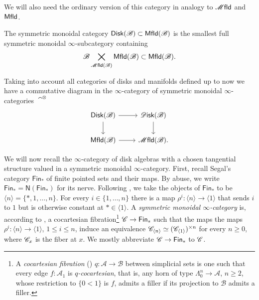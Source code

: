 \documentclass[../text]{subfiles}
\begin{document}
We will also need the ordinary version of this category in analogy to $\mfld$ and $\mfld[r]$.

\begin{definition}
    The symmetric monoidal category $\disk[r](\bstr) \subset \mfld[r](\bstr)$ is the smallest full symmetric monoidal $\infty$-subcategory containing 
    \begin{equation}
        \bstr \bigtimes\limits_{\mfld(\bstr)} \mfld[r](\bstr) \subset \mfld[r](\bstr).
    \end{equation}
\end{definition}

\begin{remark}
    Taking into account all categories of disks and manifolds defined up to now we have a commutative diagram in the $\infty$-category of symmetric monoidal $\infty$-categories $\cat^{\otimes}$
    \begin{equation}
        \begin{tikzcd}
            \disk[r](\bstr) \arrow[r] \arrow[d] & \disk (\bstr) \arrow[d] \\
            \mfld[r] (\bstr) \arrow[r] & \mfld (\bstr).
        \end{tikzcd}
    \end{equation}
\end{remark}

We will now recall the $\infty$-category of disk algebras with a chosen tangential structure valued in a symmetric monoidal $\infty$-category. First, recall Segal's category $\mathsf{Fin}_{\ast}$ of finite pointed sets and their maps. By abuse, we write $\mathsf{Fin}_\ast=\mathsf{N}(\mathsf{Fin}_\ast)$ for its nerve. Following \cite{lurie_ha}, we take the objects of $\mathsf{Fin}_{\ast}$ to be $\langle n\rangle=\{\ast,1,\dots,n\}$. For every $i\in\{1,\dots,n\}$ there is a map $\rho^i\colon\langle n\rangle\to\langle 1\rangle$ that sends $i$ to $1$ but is otherwise constant at $\ast\in\langle1\rangle$. A \emph{symmetric monoidal $\infty$-category} is, according to \cite[Definition 2.0.0.7]{lurie_ha}, a cocartesian fibration\footnote{A \emph{cocartesian fibration} (\cite[Definition 01T5]{lurie_kerodon}) $q\colon\mathscr{A}\to\mathscr{B}$ between simplicial sets is one such that every edge $f\colon\mathscr{A}_1$ is \emph{$q$-cocartesian}, that is, any horn of type $\Lambda^n_0\to\mathscr{A}$, $n\geq2$, whose restriction to $\{0<1\}$ is $f$, admits a filler if its projection to $\mathscr{B}$ admits a filler.} $\mathscr{C}\to\mathsf{Fin}_\ast$ such that the maps the maps $\rho^i\colon\langle n\rangle\to\langle 1\rangle$, $1\leq i\leq n$, induce an equivalence $\mathscr{C}_{\langle n\rangle}\simeq(\mathscr{C}_{\langle 1\rangle})^{\times n}$ for every $n\geq0$, where $\mathscr{C}_{x}$ is the fiber at $x$. We mostly abbreviate $\mathscr{C}\to\mathsf{Fin}_\ast$ to $\mathscr{C}$.
\end{document}
